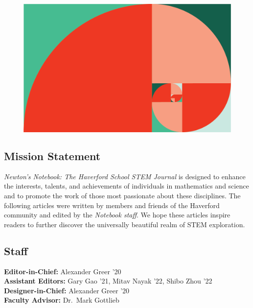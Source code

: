 \documentclass[12pt]{article}
\theoremstyle{definition}
\begin{document}
\begin{figure}[H]
    \centering
    \vspace*{75pt}
    \includegraphics[scale=1.25]{newtons_notebook_fibonacci_spiral.png}
\end{figure}

\newpage
\subsection*{Mission Statement}
\textit{Newton’s Notebook: The Haverford School STEM Journal} is designed to enhance the interests, talents, and achievements of individuals in mathematics and science and to promote the work of those most passionate about these disciplines. The following articles were written by members and friends of the Haverford community and edited by the \textit{Notebook staff}. We hope these articles inspire readers to further discover the universally beautiful realm of STEM exploration. 
\subsection*{Staff}
{\centering{}
    \textbf{Editor-in-Chief:} Alexander Greer '20
    \\
    \textbf{Assistant Editors:} Gary Gao '21, Mitav Nayak '22, Shibo Zhou '22
    \\
    \textbf{Designer-in-Chief:} Alexander Greer '20
    \\
    \textbf{Faculty Advisor:} Dr.\ Mark Gottlieb
    \\}
\end{document}

